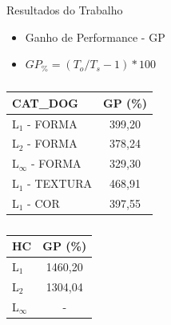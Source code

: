 \documentclass{beamer}
\begin{document}
\begin{frame}{Resultados do Trabalho}
 \begin{itemize}
  \item Ganho de Performance - GP
  \item $GP_\% = (T_o/T_s - 1)*100$
 \end{itemize}

 \begin{table}[!htb]
    \begin{minipage}{.5\linewidth}
      \caption{}
      \centering
      \begin{tabular}{l c}
            CAT\_DOG&GP (\%)\\ \hline
            L$_1$ - FORMA & 399,20 \\
            L$_2$ - FORMA & 378,24 \\
            L$_\infty$ - FORMA & 329,30 \\
            L$_1$ - TEXTURA & 468,91 \\
            L$_1$ - COR & 397,55 \\ \hline
    \end{tabular}
    \end{minipage}%
    \begin{minipage}{.5\linewidth}
      \centering
        \caption{}
   \begin{tabular}{l c}
            HC&GP (\%)\\ \hline
            L$_1$ & 1460,20 \\
            L$_2$ & 1304,04 \\
            L$_\infty$ & - \\ \hline
    \end{tabular}
    \end{minipage} 
\end{table}
 

 
\end{frame}
\end{document}
